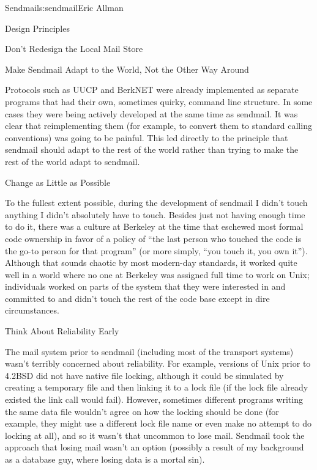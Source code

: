 \begin{aosachapter}{Sendmail}{s:sendmail}{Eric Allman}
\begin{aosasect1}{Design Principles}
\begin{aosasect2}{Don't Redesign the Local Mail Store}
\end{aosasect2}

\begin{aosasect2}{Make Sendmail Adapt to the World, Not the Other Way Around}

Protocols such as UUCP and BerkNET were already implemented as
separate programs that had their own, sometimes quirky, command line
structure. In some cases they were being actively developed at the
same time as sendmail. It was clear that reimplementing them (for
example, to convert them to standard calling conventions) was going to
be painful. This led directly to the principle that sendmail should
adapt to the rest of the world rather than trying to make the rest of
the world adapt to sendmail.

\end{aosasect2}

\begin{aosasect2}{Change as Little as Possible}

To the fullest extent possible, during the development of sendmail I
didn't touch anything I didn't absolutely have to touch. Besides just
not having enough time to do it, there was a culture at Berkeley at
the time that eschewed most formal code ownership in favor of a policy
of ``the last person who touched the code is the go-to person for that
program'' (or more simply, ``you touch it, you own it''). Although
that sounds chaotic by most modern-day standards, it worked quite well
in a world where no one at Berkeley was assigned full time to work on
Unix; individuals worked on parts of the system that they were
interested in and committed to and didn't touch the rest of the code
base except in dire circumstances.

\end{aosasect2}

\begin{aosasect2}{Think About Reliability Early}

The mail system prior to sendmail (including most of the transport
systems) wasn't terribly concerned about reliability. For example,
versions of Unix prior to 4.2BSD did not have native file locking,
although it could be simulated by creating a temporary file and then
linking it to a lock file (if the lock file already existed the link
call would fail). However, sometimes different programs writing the
same data file wouldn't agree on how the locking should be done (for
example, they might use a different lock file name or even make no attempt
to do locking at all), and so it wasn't
that uncommon to lose mail.  Sendmail took the approach that losing
mail wasn't an option (possibly a result of my background as a
database guy, where losing data is a mortal sin).


\end{aosasect2}
\end{aosasect1}
\end{aosachapter}
